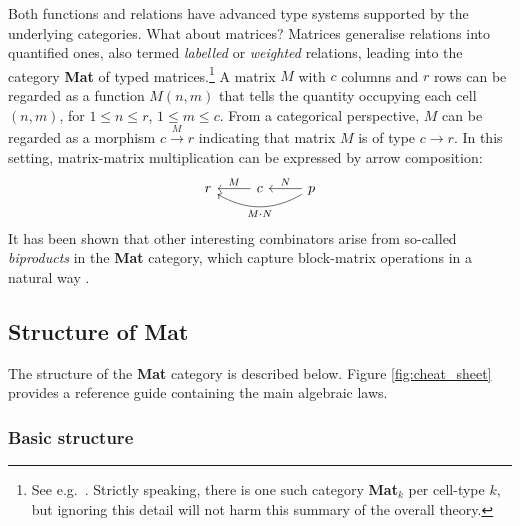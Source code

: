 \documentclass[sigplan]{acmart}\settopmatter{}
\begin{document}
Both functions and relations have advanced type systems supported by the underlying categories. What about matrices? Matrices generalise relations into quantified ones, also termed \emph{labelled} or \emph{weighted} relations, leading into the category \textbf{Mat} of typed matrices.\footnote{See e.g.\ \cite{MO13c}. Strictly speaking, there is one such category \textbf{Mat}$_k$ per cell-type $k$, but ignoring this detail will not harm this summary of the overall theory.} A matrix $M$ with $c$ columns and $r$ rows can be regarded as a function $M(n, m)$ that tells the quantity occupying each cell $(n,m)$, for $1 \leq n \leq r$,  $1 \leq m \leq c$. From a categorical perspective, $M$ can be regarded as a morphism $c \xrightarrow{M} r$ indicating that matrix $M$ is of type $c \longrightarrow r$. In this setting, matrix-matrix multiplication can be expressed by arrow composition:
\begin{equation}\label{mm-cat-comp}
\begin{tikzcd}
r & c \arrow[l, "M"'] & p \arrow[l, "N"'] \arrow[ll, "M \cdot N", bend left]
\end{tikzcd}
\end{equation}{}
\noindent It has been shown that other interesting combinators arise from so-called \emph{biproducts} in the \textbf{Mat} category, which capture block-matrix operations in a natural way \cite{MO13c}. 

\subsection{Structure of \textbf{Mat}}\label{sec-struct-mat}
The structure of the \textbf{Mat} category is described below. \newline Figure \ref{fig:cheat_sheet} provides a reference guide containing the main algebraic laws.

\subsubsection{Basic structure}
\end{document}
